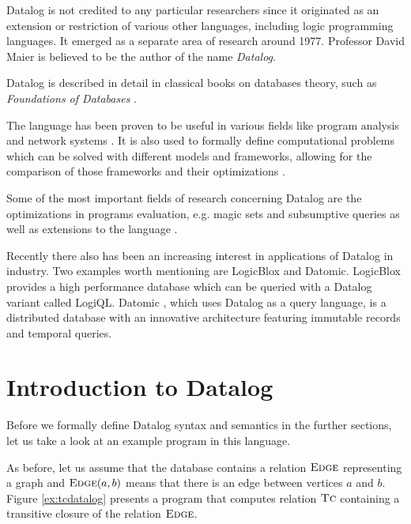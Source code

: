 Datalog is not credited to any particular researchers since it originated as an extension or restriction of various other languages, including logic programming languages. It emerged as a separate area of research around 1977. Professor David Maier is believed to be the author of the name \emph{Datalog}.

Datalog is described in detail in classical books on databases theory, such as \emph{Foundations of Databases} \cite{fod}.

The language has been proven to be useful in various fields like program analysis \cite{pointanalysis} and network systems \cite{boomanalysis, dataloganalysis}. It is also used to formally define computational problems which can be solved with different models and frameworks, allowing for the comparison of those frameworks and their optimizations \cite{ullman}. 

Some of the most important fields of research concerning Datalog are the optimizations in programs evaluation, e.g. magic sets \cite{magicsets} and subsumptive queries \cite{subsumptivequeries} as well as extensions to the language \cite{magicsetsexist, disjunctivedatalog, datalogrelaunched}.

Recently there also has been an increasing interest in applications of Datalog in industry. Two examples worth mentioning are LogicBlox and Datomic. LogicBlox \cite{logicblox} provides a high performance database which can be queried with a Datalog variant called LogiQL.  Datomic \cite{datomic}, which uses Datalog as a query language, is a distributed database with an innovative architecture featuring immutable records and temporal queries.

\section{Introduction to Datalog}

Before we formally define Datalog syntax and semantics in the further sections, let us take a look at an example program in this language.

As before, let us assume that the database contains a relation $\textsc{Edge}$ representing a graph and $\textsc{Edge}(a, b)$ means that there is an edge between vertices $a$ and $b$. Figure \ref{ex:tcdatalog} presents a program that computes relation $\textsc{Tc}$ containing a transitive closure of the relation $\textsc{Edge}$.


